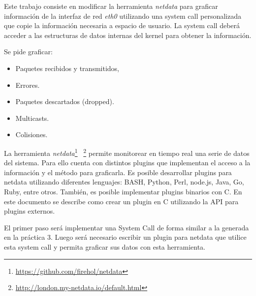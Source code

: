 Este trabajo consiste en modificar la herramienta \textit{netdata} para
graficar
información de la interfaz de red \textit{eth0} utilizando una system call
personalizada que copie la información necesaria a espacio de usuario.
La system call deberá acceder a las estructuras de datos internas del kernel
para obtener la información.

Se pide graficar:
\begin{itemize}
	\item Paquetes recibidos y transmitidos,
	\item Errores.
	\item Paquetes descartados (dropped).
	\item Multicasts.
	\item Colisiones.
\end{itemize}

La herramienta
\textit{netdata}\footnote{\url{https://github.com/firehol/netdata}}%
~\footnote{\url{http://london.my-netdata.io/default.html}}
permite monitorear en tiempo real una serie de datos del sistema. Para ello
cuenta con distintos plugins que implementan el acceso a la información y el
método para graficarla. Es posible desarrollar plugins para netdata utilizando
diferentes lenguajes: BASH, Python, Perl, node.js, Java, Go, Ruby, entre otros.
También, es posible implementar plugins binarios con C. En este documento se
describe como crear un plugin en C utilizando la API para plugins externos.

El primer paso será implementar una System Call de forma similar a la generada
en la práctica 3. Luego será necesario escribir un plugin para netdata que
utilice esta system call y permita graficar sus datos con esta herramienta.
